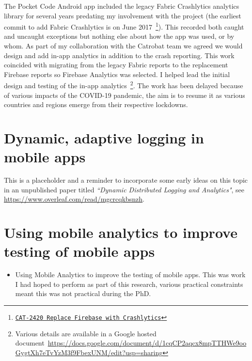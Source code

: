 The Pocket Code Android app included the legacy Fabric Crashlytics analytics library for several years predating my involvement with the project (the earliest commit to add Fabric Crashlytics is on  June 2017~\footnote{\href{https://github.com/Catrobat/Catroid/commit/95aa37ff5263402b41b63f50296aabc8c354433e}{\texttt{CAT-2420 Replace Firebase with Crashlytics}}}). This recorded both caught and uncaught exceptions but nothing else about how the app was used, or by whom. As part of my collaboration with the Catrobat team we agreed we would design and add in-app analytics in addition to the crash reporting. This work coincided with migrating from the legacy Fabric reports to the replacement Firebase reports so Firebase Analytics was selected. I helped lead the initial design and testing of the in-app analytics~\footnote{Various details are available in a Google hosted document~\url{https://docs.google.com/document/d/1cqCP2aqcx8mpTTHWe9ooGygtXh7eTvYzM3f9FbexUNM/edit?usp=sharing}}. The work has been delayed because of various impacts of the COVID-19 pandemic, the aim is to resume it as various countries and regions emerge from their respective lockdowns.


\section{Dynamic, adaptive logging in mobile apps}
This is a placeholder and a reminder to incorporate some early ideas on this topic in an unpublished paper titled \emph{``Dynamic Distributed Logging and Analytics"}, see \url{https://www.overleaf.com/read/mgcrcqkbsnzh}.

\section{Using mobile analytics to improve testing of mobile apps}
\begin{itemize}
    \item Using Mobile Analytics to improve the testing of mobile apps. This was work I had hoped to perform as part of this research, various practical constraints meant this was not practical during the PhD.
\end{itemize}

